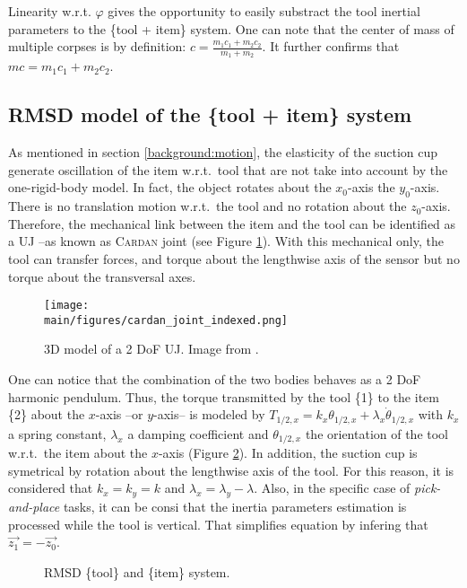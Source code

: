 \documentclass[/home/francois/latex/report/main.tex]{subfiles}
\begin{document}
Linearity w.r.t. $\varphi$ gives the opportunity to easily substract the tool inertial parameters to the \{tool + item\} system. One can note that the center of mass of multiple corpses is by definition: $c = \frac{m_1 c_1 + m_2 c_2}{m_1 + m_2}$. It further confirms that $mc = m_1 c_1 + m_2 c_2$.

\subsection{\ac{RMSD} model of the \{tool + item\} system}

As mentioned in section \ref{background:motion}, the elasticity of the suction cup generate oscillation of the item w.r.t.\ tool that are not take into account by the one-rigid-body model. In fact, the object rotates about the $x_0$-axis the $y_0$-axis. There is no translation motion w.r.t.\ the tool and no rotation about the $z_0$-axis. Therefore, the mechanical link between the item and the tool can be identified as a \ac{UJ} –as known as \textsc{Cardan} joint (see Figure \ref{fig:background:cardan}). With this mechanical only, the tool can transfer forces, and torque about the lengthwise axis of the sensor but no torque about the transversal axes.

\begin{figure}
  \centering
  \texttt{[image: \\main/figures/cardan\_joint\_indexed.png]}
  \caption{3D model of a 2 \ac{DoF} \ac{UJ}. Image from \cite{3dexport2020}.}
  \label{fig:background:cardan}
\end{figure}

One can notice that the combination of the two bodies behaves as a 2 \ac{DoF} harmonic pendulum. Thus, the torque transmitted by the tool \{1\} to the item \{2\} about the $x$-axis –or $y$-axis– is modeled by $T_{1/2, x} = k_x \theta_{1/2, x} + \lambda_x \dot{\theta}_{1/2, x}$ with $k_x$ a spring constant,  $\lambda_x$ a damping coefficient and $\theta_{1/2, x}$ the orientation of the tool w.r.t.\ the item about the $x$-axis (Figure \ref{fig:tikz:two_bodies}). In addition, the suction cup is symetrical by rotation about the lengthwise axis of the tool. For this reason, it is considered that $k_x = k_y = k$ and $\lambda_x = \lambda_y - \lambda$. Also, in the specific case of \textit{pick-and-place} tasks, it can be consi that the inertia parameters estimation is processed while the tool is vertical. That simplifies equation by infering that $\overrightarrow{z_1} = -\overrightarrow{z_0}$.

\begin{figure}
\centering
   \caption{\ac{RMSD} \{tool\} and \{item\} system.}
   \label{fig:tikz:two_bodies}
\end{figure}
\end{document}
